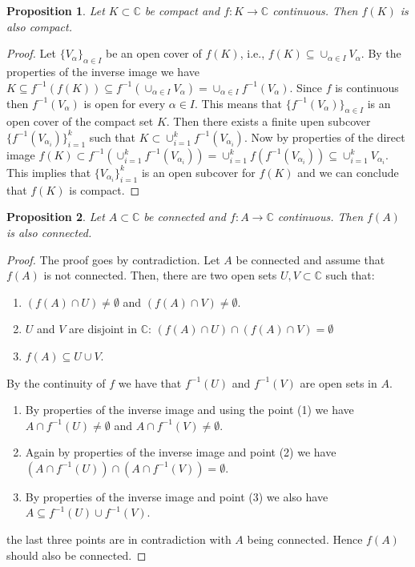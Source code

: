 \documentclass{amsart}
\newtheorem{prop}{Proposition}
\begin{document}
\begin{prop}
Let \(K\subset\mathbb{C}\) be compact and \(f: K \to \mathbb{C}\) continuous. Then \(f(K)\) is also compact.
\end{prop}
\begin{proof}
Let \(\{V_{\alpha}\}_{\alpha \in I}\) be an open cover of \(f(K)\), i.e., \(f(K) \subseteq \cup_{\alpha \in I}V_{\alpha}\). By the properties of the inverse image we have \(K \subseteq f^{-1}\left(f(K) \right) \subseteq f^{-1}\left(\cup_{\alpha \in I}V_{\alpha}\right) = \cup_{\alpha \in I}f^{-1}(V_{\alpha})\). Since \(f\) is continuous then \(f^{-1}(V_{\alpha})\) is open for every \(\alpha \in I\). This means that \(\{f^{-1}(V_{\alpha})\}_{\alpha\in I}\) is an open cover of the compact set \(K\). Then there exists a finite upen subcover \(\{f^{-1}(V_{\alpha_i})\}_{i=1}^{k}\) such that \(K\subset \cup_{i=1}^{k} f^{-1}(V_{\alpha_i})\). Now by properties of the direct image \(f(K) \subset f^{-1}\left(\cup_{i=1}^{k} f^{-1}(V_{\alpha_i}) \right) = \cup_{i=1}^{k} f\left(f^{-1}(V_{\alpha_i})\right) \subseteq \cup_{i=1}^{k} V_{\alpha_i}\). This implies that \(\{V_{\alpha_i}\}_{i=1}^{k}\) is an open subcover for \(f(K)\) and we can conclude that \(f(K)\) is compact.
\end{proof}

\begin{prop}
Let \(A\subset\mathbb{C}\) be connected and \(f: A \to \mathbb{C}\) continuous. Then \(f(A)\) is also connected.
\end{prop}
\begin{proof}
The proof goes by contradiction. Let \(A\) be connected and assume that \(f(A)\) is not connected. Then, there are two open sets \(U,V \subset \mathbb{C}\) such that:
\begin{enumerate}
\item \((f(A)\cap U) \neq \emptyset\) and \((f(A)\cap V) \neq \emptyset\).
\item \(U\) and \(V\) are disjoint in \(\mathbb{C}\): \((f(A)\cap U) \cap( f(A)\cap  V) = \emptyset\)
\item \(f(A)\subseteq U\cup V\).
\end{enumerate}
By the continuity of \(f\) we have that \(f^{-1}(U)\) and \(f^{-1}(V)\) are open sets in \(A\).\\
\begin{enumerate}
\item By properties of the inverse image and using the point (1) we have \(A \cap f^{-1}(U) \neq \emptyset\) and \(A \cap f^{-1}(V) \neq \emptyset\).\\
\item Again by properties of the inverse image and point (2) we have \(\left(A\cap f^{-1}(U)\right) \cap \left( A \cap f^{-1}(V)\right) = \emptyset\).\\
\item By properties of the inverse image and point (3) we also have \(A\subseteq f^{-1}(U)\cup f^{-1}(V)\).
\end{enumerate}
the last three points are in contradiction with \(A\) being connected. Hence \(f(A)\) should also be connected.
\end{proof}
\end{document}

